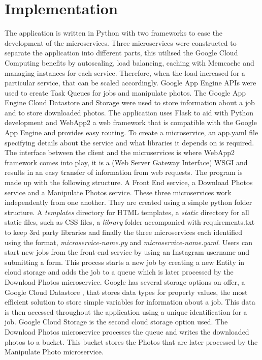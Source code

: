 \documentclass[conference]{IEEEtran}
\begin{document}
\section{Implementation}

The application is written in Python with two frameworks to ease the development of the microservices. Three microservices were constructed to separate the application into different parts, this utilised the Google Cloud Computing benefits by autoscaling, load balancing, caching with Memcache and managing instances for each service. Therefore, when the load increased for a particular service, that can be scaled accordingly. Google App Engine APIs were used to create Task Queues for jobs and manipulate photos. The Google App Engine Cloud Datastore and Storage were used to store information about a job and to store downloaded photos. \newline
\newline
The application uses Flask \cite{flask} to aid with Python development and WebApp2 \cite{webapp2} a web framework that is compatible with the Google App Engine and provides easy routing. To create a microservice, an app.yaml file specifying details about the service and what libraries it depends on is required. The interface between the client and the microservices is where WebApp2 framework comes into play, it is a (Web Server Gateway Interface) WSGI and results in an easy transfer of information from web requests. \newline
\newline
The program is made up with the following structure. A Front End service, a Download Photos service and a Manipulate Photos service. These three microservices work independently from one another. They are created using a simple python folder structure. A \emph{templates} directory for HTML templates, a \emph{static} directory for all static files, such as CSS files, a \emph{library} folder accompanied with requirements.txt to keep 3rd party libraries and finally the three microservices each identified using the format, \emph{microservice-name.py} and \emph{microservice-name.yaml}.\newline
\newline
Users can start new jobs from the front-end service by using an Instagram username and submitting a form. This process starts a new job by creating a new Entity in cloud storage and adds the job to a queue which is later processed by the Download Photos microservice. Google has several storage options on offer, a Google Cloud Datastore \cite{gae:entity}, that stores data types for property values, the most efficient solution to store simple variables for information about a job. This data is then accessed throughout the application using a unique identification for a job.\newline
\newline
Google Cloud Storage \cite{gae:gcs} is the second cloud storage option used. The Download Photos microservice processes the queue and writes the downloaded photos to a bucket. This bucket stores the Photos that are later processed by the Manipulate Photo microservice.
\end{document}
